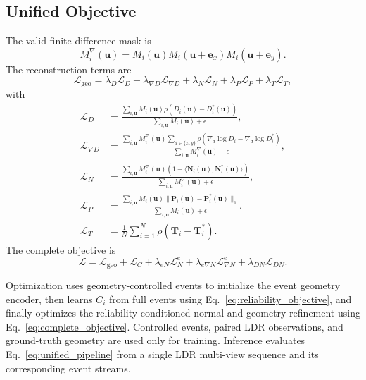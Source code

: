 \subsection{Unified Objective}
\label{sec:unified_objective}

The valid finite-difference mask is
\begin{equation}
    M_i^{\nabla}(\bm u)=
    M_i(\bm u)M_i(\bm u+\bm e_x)M_i(\bm u+\bm e_y).
    \label{eq:geometry_stencil_mask}
\end{equation}
The reconstruction terms are
\begin{equation}
    \mathcal{L}_{\mathrm{geo}}=
    \lambda_D\mathcal{L}_{D}+
    \lambda_{\nabla D}\mathcal{L}_{\nabla D}+
    \lambda_{N}\mathcal{L}_{N}+
    \lambda_{P}\mathcal{L}_{P}+
    \lambda_{T}\mathcal{L}_{T},
    \label{eq:geometry_objective}
\end{equation}
with
\begin{align}
    \mathcal{L}_{D}
    &=\frac{\sum_{i,\bm u}M_i(\bm u)
    \rho(D_i(\bm u)-D_i^{*}(\bm u))}
    {\sum_{i,\bm u}M_i(\bm u)+\epsilon},
    \label{eq:depth_loss}\\
    \mathcal{L}_{\nabla D}
    &=\frac{\sum_{i,\bm u}M_i^{\nabla}(\bm u)
    \sum_{d\in\{x,y\}}
    \rho(\nabla_d\log D_i-\nabla_d\log D_i^{*})}
    {\sum_{i,\bm u}M_i^{\nabla}(\bm u)+\epsilon},
    \label{eq:depth_gradient_loss}\\
    \mathcal{L}_{N}
    &=\frac{\sum_{i,\bm u}M_i^{\nabla}(\bm u)
    (1-\langle\bm N_i(\bm u),\bm N_i^{*}(\bm u)\rangle)}
    {\sum_{i,\bm u}M_i^{\nabla}(\bm u)+\epsilon},
    \label{eq:final_normal_loss}\\
    \mathcal{L}_{P}
    &=\frac{\sum_{i,\bm u}M_i(\bm u)
    \|\bm P_i(\bm u)-\bm P_i^{*}(\bm u)\|_1}
    {\sum_{i,\bm u}M_i(\bm u)+\epsilon}.
    \label{eq:point_loss}\\
    \mathcal{L}_{T}
    &=\frac{1}{N}\sum_{i=1}^{N}
    \rho(\bm T_i-\bm T_i^{*}).
    \label{eq:pose_loss}
\end{align}
The complete objective is
\begin{equation}
    \boxed{
    \mathcal{L}=
    \mathcal{L}_{\mathrm{geo}}+
    \mathcal{L}_{C}+
    \lambda_{eN}\mathcal{L}_{N}^{e}+
    \lambda_{e\nabla N}\mathcal{L}_{\nabla N}^{e}+
    \lambda_{DN}\mathcal{L}_{DN}.}
    \label{eq:complete_objective}
\end{equation}

Optimization uses geometry-controlled events to initialize the event geometry
encoder, then learns $C_i$ from full events using
Eq.~\eqref{eq:reliability_objective}, and finally optimizes the
reliability-conditioned normal and geometry refinement using
Eq.~\eqref{eq:complete_objective}. Controlled events, paired LDR observations,
and ground-truth geometry are used only for training. Inference evaluates
Eq.~\eqref{eq:unified_pipeline} from a single LDR multi-view sequence and its
corresponding event streams.
